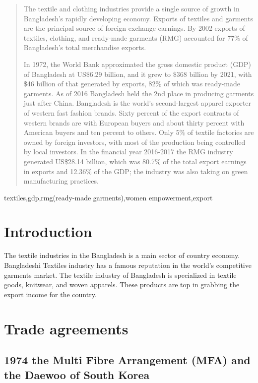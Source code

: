 \documentclass[conference]{IEEEtran}
\begin{document}
\begin{abstract}
The textile and clothing industries provide a single source of growth in Bangladesh's rapidly developing economy. Exports of textiles and garments are the principal source of foreign exchange earnings. By 2002 exports of textiles, clothing, and ready-made garments (RMG) accounted for 77\% of Bangladesh's total merchandise exports.

In 1972, the World Bank approximated the gross domestic product (GDP) of Bangladesh at US\$6.29 billion, and it grew to \$368 billion by 2021, with \$46 billion of that generated by exports, 82\% of which was ready-made garments. As of 2016 Bangladesh held the 2nd place in producing garments just after China. Bangladesh is the world's second-largest apparel exporter of western fast fashion brands. Sixty percent of the export contracts of western brands are with European buyers and about thirty percent with American buyers and ten percent to others. Only 5\% of textile factories are owned by foreign investors, with most of the production being controlled by local investors. In the financial year 2016-2017 the RMG industry generated US\$28.14 billion, which was 80.7\% of the total export earnings in exports and 12.36\% of the GDP; the industry was also taking on green manufacturing practices.


\end{abstract}

\begin{IEEEkeywords}
textiles,gdp,rmg(ready-made garments),women empowerment,export
\end{IEEEkeywords}

\section{Introduction}
The textile industries in the Bangladesh is a main sector of country economy. Bangladeshi Textiles industry has a famous reputation in the world’s competitive garments market. The textile industry of Bangladesh is specialized in textile goods, knitwear, and woven apparels. These products are top in grabbing the export income for the country.

\section{Trade agreements}

\subsection{1974 the Multi Fibre Arrangement (MFA) and the Daewoo of South Korea}
\end{document}
